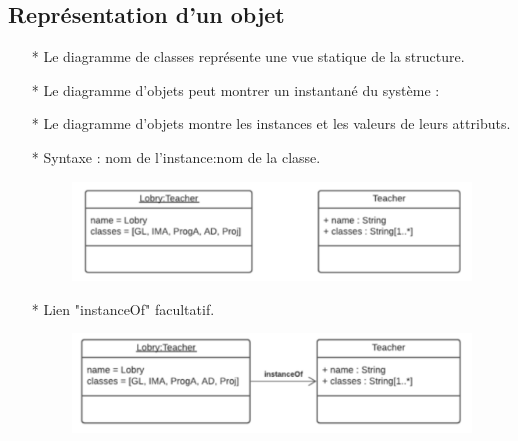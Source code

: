 \documentclass[12pt]{article}
\begin{document}
	\subsection{Représentation d'un objet}
	\begin{itemize}
		\item[* ] Le diagramme de classes représente une vue statique de la structure.
		\item[* ] Le diagramme d'objets peut montrer un instantané du système :
		\item[* ] Le diagramme d'objets montre les instances et les valeurs de leurs attributs.
		\item[* ] Syntaxe : nom de l'instance:nom de la classe.
		\begin{figure}[!hbtp]
			\centering
			\includegraphics[scale=0.75]{Capture12.PNG}
		\end{figure}
	\item[* ] Lien "instanceOf" facultatif.
	\begin{figure}[!hbtp]
		\centering
		\includegraphics[scale=0.75]{Capture13.PNG}
	\end{figure}
	\end{itemize}
\end{document}
